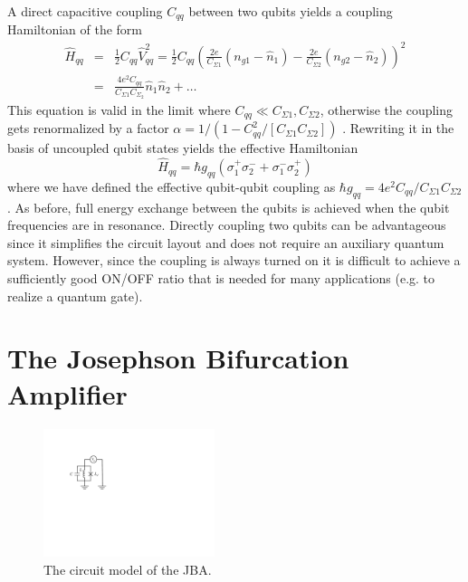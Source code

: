 A direct capacitive coupling $C_{qq}$ between two qubits yields a coupling Hamiltonian of the form
%
\begin{eqnarray}
\hat{H}_{qq} & = & \frac{1}{2}C_{qq}\hat{V}_{qq}^2 = \frac{1}{2}C_{qq}\left(\frac{2e}{C_{\Sigma 1}}(n_{g1}-\hat{n}_1)-\frac{2e}{C_{\Sigma 2}}(n_{g2}-\hat{n}_2)\right)^2 \\
& = & \frac{4e^2 C_{qq}}{C_{\Sigma 1}C_{\Sigma_2}}\hat{n}_1\hat{n}_2+\hdots \label{eq:cqed_capacitive_coupling}
\end{eqnarray}
%
This equation is valid in the limit where $C_{qq} \ll C_{\Sigma 1},C_{\Sigma 2}$, otherwise the coupling gets renormalized by a factor $\alpha = 1/(1-C_{qq}^2/[C_{\Sigma 1}C_{\Sigma 2}])$ \citep{nguyen_cooper_2008}. Rewriting it in the basis of uncoupled qubit states yields the effective Hamiltonian
%
\begin{equation}
\hat{H}_{qq} = \hbar g_{qq}\left(\sigma^+_1\sigma^-_2+\sigma^-_1\sigma^+_2\right)
\end{equation}
%
where we have defined the effective qubit-qubit coupling as $\hbar g_{qq} = 4e^2 C_{qq}/C_{\Sigma 1}C_{\Sigma 2}$. As before, full energy exchange between the qubits is achieved when the qubit frequencies are in resonance. Directly coupling two qubits can be advantageous since it simplifies the circuit layout and does not require an auxiliary quantum system. However, since the coupling is always turned on it is difficult to achieve a sufficiently good ON/OFF ratio that is needed for many applications (e.g. to realize a quantum gate).

\section{The Josephson Bifurcation Amplifier}

\begin{figure}
	\includegraphics[width=5cm]{"./material/figures/introduction/nonlinear resonator"}
	\caption{The circuit model of the JBA.}
	\label{fig:jba_schematic}
\end{figure}

